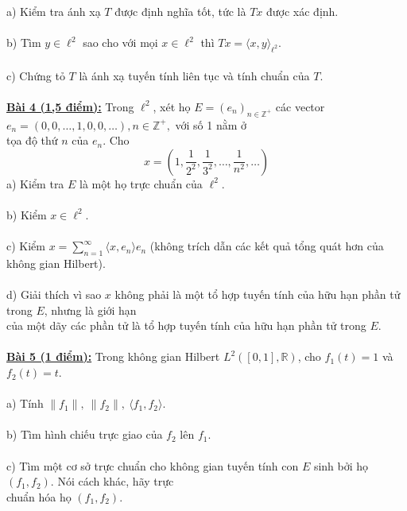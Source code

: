 \documentclass[10pt, a4paper]{article}
\begin{document}
\color{red}a) \color{black}Kiểm tra ánh xạ $T$ được định nghĩa tốt, tức là $Tx$ được xác định.\\\\
\color{red}b) \color{black}Tìm $y\in\ell^2$ sao cho với mọi $x\in\ell^2$ thì $Tx=\langle x,y\rangle_{\ell^2}$.\\\\
\color{red}c) \color{black}Chứng tỏ $T$ là ánh xạ tuyến tính liên tục và tính chuẩn của $T$.\\\\
\color{red}\underline{\textbf{Bài 4 (1,5 điểm):}} \color{black}Trong $\ell^2$, xét họ $E=(e_n)_{n\in\mathbb Z^+}$ các vector $e_n=(0,0,\dots,1,0,0,\dots),n\in\mathbb Z^+,$ với số 1 nằm ở\\ tọa độ thứ $n$ của $e_n$. Cho $$x=\left(1,\dfrac{1}{2^2},\dfrac{1}{3^2},\dots,\dfrac{1}{n^2},\dots\right)$$
\color{red}a) \color{black}Kiểm tra $E$ là một họ trực chuẩn của $\ell^2$.\\\\
\color{red}b) \color{black}Kiểm $x\in\ell^2$.\\\\
\color{red}c) \color{black}Kiểm $x=\displaystyle\sum_{n=1}^\infty\langle x,e_n\rangle e_n$ (không trích dẫn các kết quả tổng quát hơn của không gian Hilbert).\\\\
\color{red}d) \color{black}Giải thích vì sao $x$ không phải là một tổ hợp tuyến tính của hữu hạn phần tử trong $E$, nhưng là giới hạn\\ của một dãy các phần tử là tổ hợp tuyến tính của hữu hạn phần tử trong $E$.\\\\
\color{red}\underline{\textbf{Bài 5 (1 điểm):}} \color{black}Trong không gian Hilbert $L^2([0,1],\mathbb R)$, cho $f_1(t)=1$ và $f_2(t)=t$.\\\\
\color{red}a) \color{black}Tính $\lVert f_1\rVert,~\lVert f_2\rVert,~\langle f_1,f_2\rangle$.\\\\
\color{red}b) \color{black}Tìm hình chiếu trực giao của $f_2$ lên $f_1$.\\\\
\color{red}c) \color{black}Tìm một cơ sở trực chuẩn cho không gian tuyến tính con $E$ sinh bởi họ $(f_1,f_2)$. Nói cách khác, hãy trực\\ chuẩn hóa họ $(f_1,f_2)$.

\newpage
\end{document}
